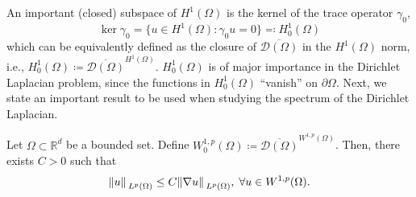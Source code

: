 An important (closed) subspace of \(H^1(\Omega)\) is the kernel of the trace operator \(\gamma_0\),
\[
    \ker \gamma_0 = \{u \in H^1(\Omega): \gamma_0 u = 0\} \eqqcolon H^1_0(\Omega)
\] 
which can be equivalently defined as the closure of \(\overline{\mathcal{D}(\Omega)}\) in the \(H^1(\Omega)\) norm, i.e.,  \(H^1_0(\Omega) \coloneqq \overline{\mathcal{D}(\Omega)}^{H^1(\Omega)}\). \(H^1_0(\Omega)\) is of major importance in the Dirichlet Laplacian problem, since the functions in \(H^1_0(\Omega)\) ``vanish'' on \(\partial\Omega\). Next, we state an important result to be used when studying the spectrum of the Dirichlet Laplacian.
\begin{theorem}
    Let \(\Omega \subset \mathbb{R}^d\) be a bounded set. Define \(W^{1, p}_0(\Omega) \coloneqq \overline{\mathcal{D}(\Omega)}^{W^{1, p}(\Omega)}\). Then, there exists \(C > 0\) such that
    \[
        \norm*{u}_{L^p(\Omega)} \leq C \norm*{\nabla u}_{L^p(\Omega)}, \; \forall u \in W^{1, p}(\Omega).
    \]
\end{theorem}

